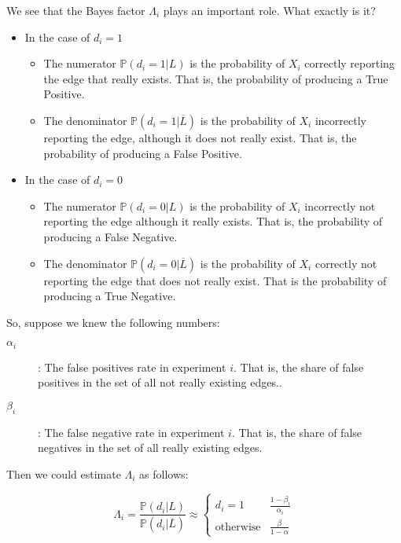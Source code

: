 \documentclass{scrartcl}
\newcommand{\prob}{\mathbb{P}}
\begin{document}
We see that the Bayes factor $\Lambda_i$ plays an important role. What exactly is it? 
\begin{itemize}
	\item In the case of $d_i = 1$
	\begin{itemize}
		\item The numerator $\prob(d_i = 1|L)$ is the probability of $X_i$ correctly reporting the edge that really exists. That is, the probability of producing a True Positive.
		\item The denominator $\prob(d_i = 1|\overline{L})$ is the probability of $X_i$ incorrectly reporting the edge, although it does not really exist. That is, the probability of producing a False Positive.
	\end{itemize}
	\item In the case of $d_i = 0$
	\begin{itemize}
		\item The numerator $\prob(d_i = 0|L)$ is the probability of $X_i$ incorrectly not reporting the edge although it really exists. That is, the probability of producing a False Negative. 
		\item The denominator $\prob(d_i = 0|\overline{L})$ is the probability of $X_i$ correctly not reporting the edge that does not really exist. That is the probability of producing a True Negative.
	\end{itemize}
\end{itemize}

So, suppose we knew the following numbers:

\begin{description}
	\item[$\alpha_i$]: The false positives rate in experiment $i$. That is, the share of false positives in the set of all not really existing edges..
	\item[$\beta_i$]: The false negative rate in experiment $i$. That is, the share of false negatives in the set of all really existing edges.
\end{description}

Then we could estimate $\Lambda_i$ as follows:

$$
\Lambda_i = \frac{\prob(d_i|L)}{\prob(d_i|\overline{L})} \approx
\begin{cases}
	d_i=1 & \frac{1-\beta_i}{\alpha_i}\\
	\text{otherwise} & \frac{\beta}{1-\alpha}
\end{cases}
$$
\end{document}
